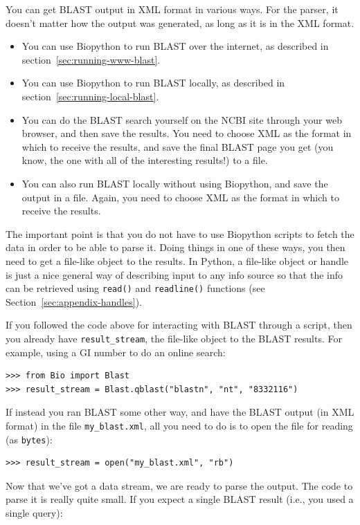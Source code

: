 You can get BLAST output in XML format in various ways. For the parser, it
doesn't matter how the output was generated, as long as it is in the XML format.
\begin{itemize}
\item You can use Biopython to run BLAST over the internet, as described in
section~\ref{sec:running-www-blast}.
\item You can use Biopython to run BLAST locally, as described in
section~\ref{sec:running-local-blast}.
\item You can do the BLAST search yourself on the NCBI site through your
web browser, and then save the results. You need to choose XML as the format
in which to receive the results, and save the final BLAST page you get
(you know, the one with all of the interesting results!) to a file.
\item You can also run BLAST locally without using Biopython, and save
the output in a file. Again, you need to choose XML as the format in which
to receive the results.
\end{itemize}
The important point is that you do not have to use Biopython
scripts to fetch the data in order to be able to parse it.
Doing things in one of these ways, you then need to get a file-like object
to the results. In Python, a file-like object or handle is just a nice general way of
describing input to any info source so that the info can be retrieved
using \verb|read()| and \verb|readline()| functions
(see Section~\ref{sec:appendix-handles}).

If you followed the code above for interacting with BLAST through a
script, then you already have \verb|result_stream|, the file-like object to the
BLAST results.  For example, using a GI number to do an online search:

\begin{verbatim}
>>> from Bio import Blast
>>> result_stream = Blast.qblast("blastn", "nt", "8332116")
\end{verbatim}

If instead you ran BLAST some other way, and have the
BLAST output (in XML format) in the file \verb|my_blast.xml|, all you
need to do is to open the file for reading (as \verb|bytes|):

\begin{verbatim}
>>> result_stream = open("my_blast.xml", "rb")
\end{verbatim}

Now that we've got a data stream, we are ready to parse the output. The
code to parse it is really quite small.  If you expect a single
BLAST result (i.e., you used a single query):

